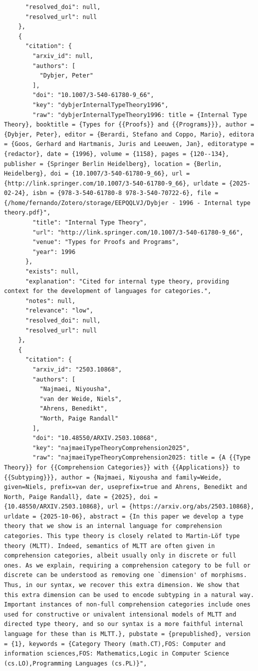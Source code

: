 \documentclass[11pt]{article}
\begin{document}
\begin{verbatim}
      "resolved_doi": null,
      "resolved_url": null
    },
    {
      "citation": {
        "arxiv_id": null,
        "authors": [
          "Dybjer, Peter"
        ],
        "doi": "10.1007/3-540-61780-9_66",
        "key": "dybjerInternalTypeTheory1996",
        "raw": "dybjerInternalTypeTheory1996: title = {Internal Type Theory}, booktitle = {Types for {{Proofs}} and {{Programs}}}, author = {Dybjer, Peter}, editor = {Berardi, Stefano and Coppo, Mario}, editora = {Goos, Gerhard and Hartmanis, Juris and Leeuwen, Jan}, editoratype = {redactor}, date = {1996}, volume = {1158}, pages = {120--134}, publisher = {Springer Berlin Heidelberg}, location = {Berlin, Heidelberg}, doi = {10.1007/3-540-61780-9_66}, url = {http://link.springer.com/10.1007/3-540-61780-9_66}, urldate = {2025-02-24}, isbn = {978-3-540-61780-8 978-3-540-70722-6}, file = {/home/fernando/Zotero/storage/EEPQQLVJ/Dybjer - 1996 - Internal type theory.pdf}",
        "title": "Internal Type Theory",
        "url": "http://link.springer.com/10.1007/3-540-61780-9_66",
        "venue": "Types for Proofs and Programs",
        "year": 1996
      },
      "exists": null,
      "explanation": "Cited for internal type theory, providing context for the development of languages for categories.",
      "notes": null,
      "relevance": "low",
      "resolved_doi": null,
      "resolved_url": null
    },
    {
      "citation": {
        "arxiv_id": "2503.10868",
        "authors": [
          "Najmaei, Niyousha",
          "van der Weide, Niels",
          "Ahrens, Benedikt",
          "North, Paige Randall"
        ],
        "doi": "10.48550/ARXIV.2503.10868",
        "key": "najmaeiTypeTheoryComprehension2025",
        "raw": "najmaeiTypeTheoryComprehension2025: title = {A {{Type Theory}} for {{Comprehension Categories}} with {{Applications}} to {{Subtyping}}}, author = {Najmaei, Niyousha and family=Weide, given=Niels, prefix=van der, useprefix=true and Ahrens, Benedikt and North, Paige Randall}, date = {2025}, doi = {10.48550/ARXIV.2503.10868}, url = {https://arxiv.org/abs/2503.10868}, urldate = {2025-10-06}, abstract = {In this paper we develop a type theory that we show is an internal language for comprehension categories. This type theory is closely related to Martin-Löf type theory (MLTT). Indeed, semantics of MLTT are often given in comprehension categories, albeit usually only in discrete or full ones. As we explain, requiring a comprehension category to be full or discrete can be understood as removing one `dimension' of morphisms. Thus, in our syntax, we recover this extra dimension. We show that this extra dimension can be used to encode subtyping in a natural way. Important instances of non-full comprehension categories include ones used for constructive or univalent intensional models of MLTT and directed type theory, and so our syntax is a more faithful internal language for these than is MLTT.}, pubstate = {prepublished}, version = {1}, keywords = {Category Theory (math.CT),FOS: Computer and information sciences,FOS: Mathematics,Logic in Computer Science (cs.LO),Programming Languages (cs.PL)}",

\end{verbatim}
\end{document}
